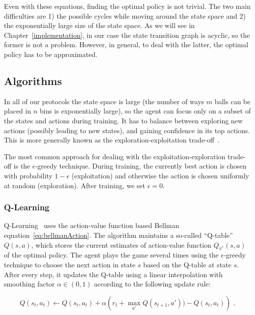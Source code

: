 Even with these equations, finding the optimal policy is not trivial. The two main difficulties are 1) the possible cycles while moving around the state space and 2) the exponentially large size of the state space. As we will see in Chapter~\ref{implementation}, in our case the state transition graph is acyclic, so the former is not a problem. However, in general, to deal with the latter, the optimal policy has to be approximated.



\subsection{Algorithms}


In all of our protocols the state space is large (the number of ways $m$ balls can be placed in $n$ bins is exponentially large), so the agent can focus only on a subset of the states and actions during training. It has to balance between exploring new actions (possibly leading to new states), and gaining confidence in its top actions. This is more generally known as the exploration-exploitation trade-off~\cite{kaelbling1996explorationexploitation}.

The most common approach for dealing with the exploitation-exploration trade-off is the $\epsilon$-greedy technique. During training, the currently best action is chosen with probability $1-\epsilon$ (exploitation) and otherwise the action is chosen uniformly at random (exploration). After training, we set $\epsilon=0$.



\subsubsection*{Q-Learning}


Q-Learning~\cite{watkins1989qlearning} uses the action-value function based Bellman equation~\eqref{eq:bellmanAction}. The algorithm maintains a so-called ``Q-table'' $Q(s,a)$, which stores the current estimates of action-value function $Q_{\pi^*}(s,a)$ of the optimal policy. The agent plays the game several times using the $\epsilon$-greedy technique to choose the next action in state $s$ based on the Q-table at state $s$. After every step, it updates the Q-table using a linear interpolation with smoothing factor $\alpha \in (0,1)$ according to the following update rule:

\begin{equation} \label{eq:q-learningUpdate}
Q(s_t,a_t) \leftarrow Q(s_t,a_t) + \alpha\left( r_t + \max_{a'} Q(s_{t+1}, a')) - Q(s_t,a_t)\right) \text{ .}
\end{equation}


